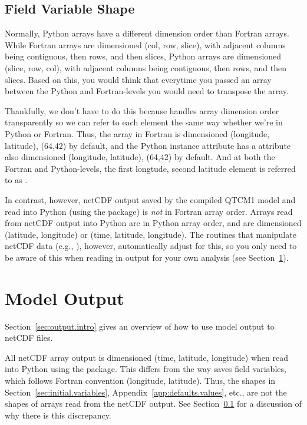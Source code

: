 	\subsection{Field Variable Shape}   \label{sec:field.var.shape}

Normally, Python arrays have a different dimension order than Fortran
arrays.  While Fortran arrays are dimensioned (col, row, slice),
with adjacent columns being contiguous, then rows, and then slices, Python
arrays are dimensioned (slice, row, col), with adjacent columns being
contiguous, then rows, and then slices.  Based on this, you would
think that everytime you passed an array between the Python and
Fortran-levels you would need to transpose the array.

Thankfully, we don't have to do this because  handles
array dimension order transparently so we can refer to each element
the same way whether we're in Python or Fortran.  Thus, the array
 in Fortran is dimensioned (longitude, latitude), (64,42)
by default, and the Python  instance attribute 
has a  attribute also dimensioned (longitude, latitude),
(64,42) by default.  And at both the Fortran and Python-levels, the
first longtude, second latitude element is referred to as .

In contrast, however, netCDF output saved by the compiled QTCM1 model
and read into Python (using the  package) is
\emph{not} in Fortran array order.  Arrays read from netCDF output
into Python are in Python array order, and are dimensioned
(latitude, longitude) or (time, latitude, longitude).  The 
routines that manipulate netCDF data (e.g., ), however,
automatically adjust for this, so you only need to be aware of this
when reading in output for your own analysis
(see Section~\ref{sec:model.output}).




\section{Model Output}			\label{sec:model.output}

Section~\ref{sec:output.intro} gives an overview of how to
use  model output to netCDF files.

All netCDF array output is dimensioned (time, latitude, longitude)
when read into Python using the  package.  This
differs from the way  saves field variables, which
follows Fortran convention (longitude, latitude).  Thus, the shapes
in Section~\ref{sec:initial.variables}, Appendix~\ref{app:defaults.values},
etc., are not the shapes of arrays read from the netCDF output.
See Section~\ref{sec:field.var.shape} for a discussion of why
there is this discrepancy.

